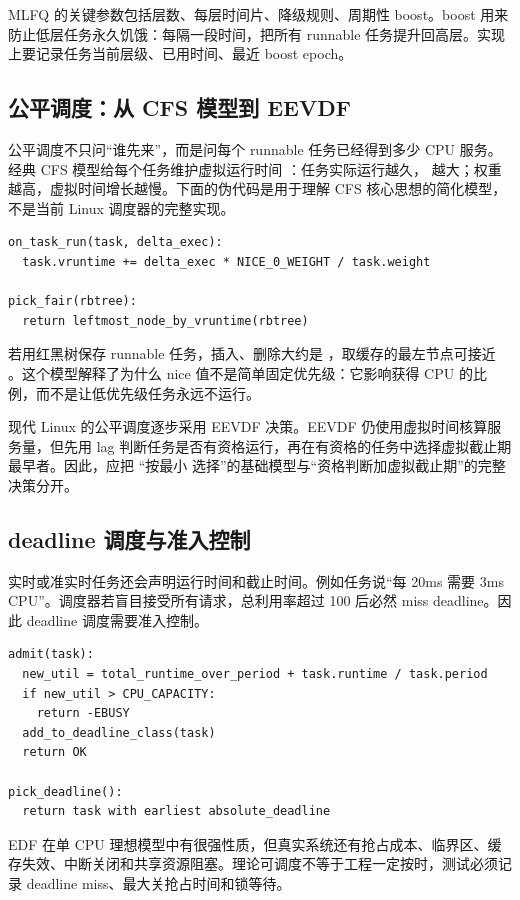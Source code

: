 MLFQ 的关键参数包括层数、每层时间片、降级规则、周期性 boost。boost 用来防止低层任务永久饥饿：每隔一段时间，把所有 runnable 任务提升回高层。实现上要记录任务当前层级、已用时间、最近 boost epoch。

\subsection{公平调度：从 CFS 模型到 EEVDF}

公平调度不只问“谁先来”，而是问每个 runnable 任务已经得到多少 CPU 服务。经典 CFS 模型给每个任务维护虚拟运行时间 ：任务实际运行越久， 越大；权重越高，虚拟时间增长越慢。下面的伪代码是用于理解 CFS 核心思想的简化模型，不是当前 Linux 调度器的完整实现。

\begin{lstlisting}
on_task_run(task, delta_exec):
  task.vruntime += delta_exec * NICE_0_WEIGHT / task.weight

pick_fair(rbtree):
  return leftmost_node_by_vruntime(rbtree)
\end{lstlisting}

若用红黑树保存 runnable 任务，插入、删除大约是 ，取缓存的最左节点可接近 。这个模型解释了为什么 nice 值不是简单固定优先级：它影响获得 CPU 的比例，而不是让低优先级任务永远不运行。

现代 Linux 的公平调度逐步采用 EEVDF 决策。EEVDF 仍使用虚拟时间核算服务量，但先用
lag 判断任务是否有资格运行，再在有资格的任务中选择虚拟截止期最早者。因此，应把
“按最小  选择”的基础模型与“资格判断加虚拟截止期”的完整决策分开。

\subsection{deadline 调度与准入控制}

实时或准实时任务还会声明运行时间和截止时间。例如任务说“每 20ms 需要 3ms CPU”。调度器若盲目接受所有请求，总利用率超过 100 后必然 miss deadline。因此 deadline 调度需要准入控制。

\begin{lstlisting}
admit(task):
  new_util = total_runtime_over_period + task.runtime / task.period
  if new_util > CPU_CAPACITY:
    return -EBUSY
  add_to_deadline_class(task)
  return OK

pick_deadline():
  return task with earliest absolute_deadline
\end{lstlisting}

EDF 在单 CPU 理想模型中有很强性质，但真实系统还有抢占成本、临界区、缓存失效、中断关闭和共享资源阻塞。理论可调度不等于工程一定按时，测试必须记录 deadline miss、最大关抢占时间和锁等待。

